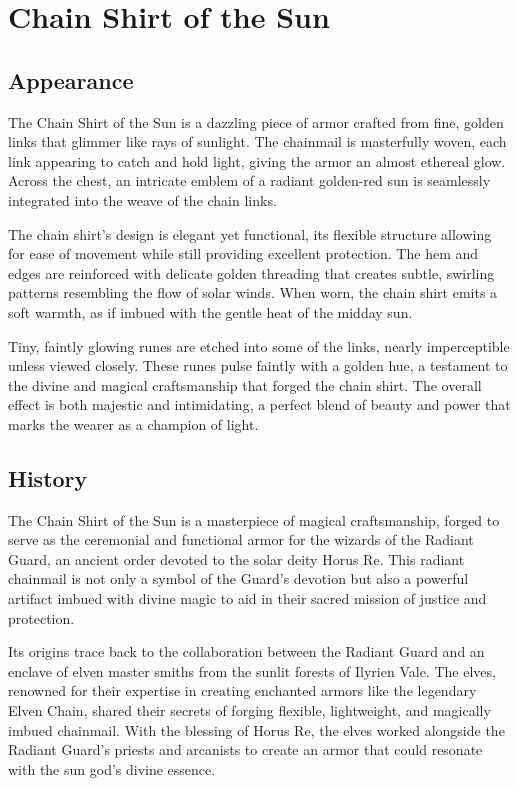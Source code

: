 
\chapter*{Chain Shirt of the Sun}
\section*{Appearance}
The Chain Shirt of the Sun is a dazzling piece of armor crafted from fine, golden links that glimmer like rays of sunlight. The chainmail is masterfully woven, each link appearing to catch and hold light, giving the armor an almost ethereal glow. Across the chest, an intricate emblem of a radiant golden-red sun is seamlessly integrated into the weave of the chain links.

The chain shirt's design is elegant yet functional, its flexible structure allowing for ease of movement while still providing excellent protection. The hem and edges are reinforced with delicate golden threading that creates subtle, swirling patterns resembling the flow of solar winds. When worn, the chain shirt emits a soft warmth, as if imbued with the gentle heat of the midday sun.

Tiny, faintly glowing runes are etched into some of the links, nearly imperceptible unless viewed closely. These runes pulse faintly with a golden hue, a testament to the divine and magical craftsmanship that forged the chain shirt. The overall effect is both majestic and intimidating, a perfect blend of beauty and power that marks the wearer as a champion of light.

\section*{History}
The Chain Shirt of the Sun is a masterpiece of magical craftsmanship, forged to serve as the ceremonial and functional armor for the wizards of the Radiant Guard, an ancient order devoted to the solar deity Horus Re. This radiant chainmail is not only a symbol of the Guard's devotion but also a powerful artifact imbued with divine magic to aid in their sacred mission of justice and protection.

Its origins trace back to the collaboration between the Radiant Guard and an enclave of elven master smiths from the sunlit forests of Ilyrien Vale. The elves, renowned for their expertise in creating enchanted armors like the legendary Elven Chain, shared their secrets of forging flexible, lightweight, and magically imbued chainmail. With the blessing of Horus Re, the elves worked alongside the Radiant Guard's priests and arcanists to create an armor that could resonate with the sun god's divine essence.

